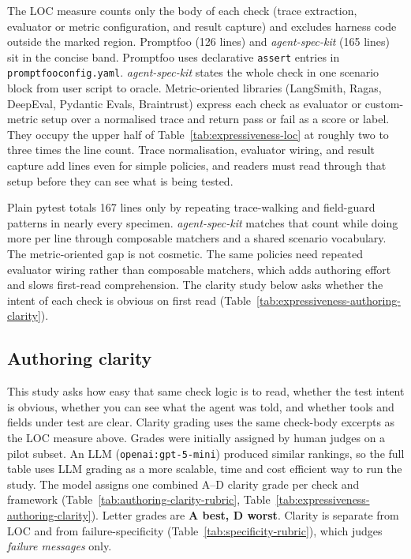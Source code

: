 The LOC measure counts only the body of each check (trace extraction, evaluator or metric configuration, and result capture) and excludes harness code outside the marked region. Promptfoo (126 lines) and \emph{agent-spec-kit} (165 lines) sit in the concise band. Promptfoo uses declarative \texttt{assert} entries in \texttt{promptfooconfig.yaml}. \emph{agent-spec-kit} states the whole check in one scenario block from user script to oracle. Metric-oriented libraries (LangSmith, Ragas, DeepEval, Pydantic Evals, Braintrust) express each check as evaluator or custom-metric setup over a normalised trace and return pass or fail as a score or label. They occupy the upper half of Table~\ref{tab:expressiveness-loc} at roughly two to three times the line count. Trace normalisation, evaluator wiring, and result capture add lines even for simple policies, and readers must read through that setup before they can see what is being tested.

Plain pytest totals 167 lines only by repeating trace-walking and field-guard patterns in nearly every specimen. \emph{agent-spec-kit} matches that count while doing more per line through composable matchers and a shared scenario vocabulary. The metric-oriented gap is not cosmetic. The same policies need repeated evaluator wiring rather than composable matchers, which adds authoring effort and slows first-read comprehension. The clarity study below asks whether the intent of each check is obvious on first read (Table~\ref{tab:expressiveness-authoring-clarity}).

\subsection{Authoring clarity}

This study asks how easy that same check logic is to read, whether the test intent is obvious, whether you can see what the agent was told, and whether tools and fields under test are clear. Clarity grading uses the same check-body excerpts as the LOC measure above. Grades were initially assigned by human judges on a pilot subset. An LLM (\texttt{openai:gpt-5-mini}) produced similar rankings, so the full table uses LLM grading as a more scalable, time and cost efficient way to run the study. The model assigns one combined A--D clarity grade per check and framework (Table~\ref{tab:authoring-clarity-rubric}, Table~\ref{tab:expressiveness-authoring-clarity}). Letter grades are \textbf{A best, D worst}. Clarity is separate from LOC and from failure-specificity (Table~\ref{tab:specificity-rubric}), which judges \emph{failure messages} only.

